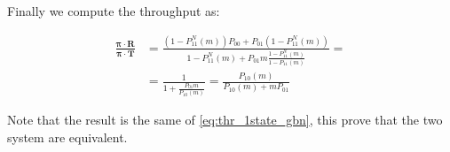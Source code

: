 Finally we compute the throughput as:

\begin{equation}
	\begin{split}
	\frac{\mathbf{\pi}\cdot\mathbf{R}}{\mathbf{\pi}\cdot\mathbf{T}} &=
	\frac{(1-P_{11}^N(m))P_{00} + P_{01}(1-P_{11}^N(m))}{1-P_{11}^N(m) + P_{01}m\frac{1-P_{11}^N(m)}{1-P_{11}(m)}} = \\
	&= \frac{1}{1+ \frac{P_{01}m}{P_{10}(m)}} = \frac{P_{10}(m)}{P_{10}(m) + mP_{01}}
	\end{split}
\end{equation}

Note that the result is the same of \autoref{eq:thr_1state_gbn}, this prove that the two system are equivalent.

